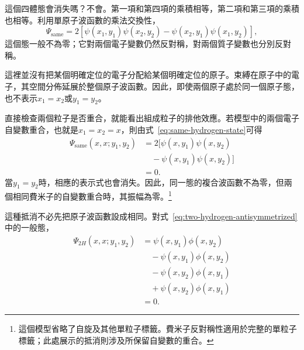 這個四體態會消失嗎？不會。第一項和第四項的乘積相等，第二項和第三項的乘積也相等。利用單原子波函數的乘法交換性，
\begin{equation}
\Psi_{\mathrm{same}}
=
2\left[
\psi(x_1,y_1)\psi(x_2,y_2)
-\psi(x_2,y_1)\psi(x_1,y_2)
\right],
\label{eq:same-hydrogen-state}
\end{equation}
這個態一般不為零；它對兩個電子變數仍然反對稱，對兩個質子變數也分別反對稱。

這裡並沒有把某個明確定位的電子分配給某個明確定位的原子。束縛在原子中的電子，其空間分佈延展於整個原子波函數。因此，即使兩個原子處於同一個原子態，也不表示\(x_1=x_2\)或\(y_1=y_2\)。

直接檢查兩個粒子是否重合，就能看出組成粒子的排他效應。若模型中的兩個電子自變數重合，也就是\(x_1=x_2=x\)，則由式~\eqref{eq:same-hydrogen-state}可得
\begin{align}
\Psi_{\mathrm{same}}(x,x;y_1,y_2)
&=2\bigl[
\psi(x,y_1)\psi(x,y_2)\nonumber\\
&\quad{}-\psi(x,y_1)\psi(x,y_2)
\bigr]\\
&=0.
\end{align}
當\(y_1=y_2\)時，相應的表示式也會消失。因此，同一態的複合波函數不為零，但兩個相同費米子的自變數重合時，其振幅為零。\footnote{這個模型省略了自旋及其他單粒子標籤。費米子反對稱性適用於完整的單粒子標籤；此處展示的抵消則涉及所保留自變數的重合。}

\begin{classroomqa}
\end{classroomqa}

\begin{classroomqa}
\end{classroomqa}

這種抵消不必先把原子波函數設成相同。對式~\eqref{eq:two-hydrogen-antisymmetrized}中的一般態，
\begin{align}
\Psi_{2H}(x,x;y_1,y_2)
&=\psi(x,y_1)\phi(x,y_2)\nonumber\\
&\quad{}-\psi(x,y_1)\phi(x,y_2)\nonumber\\
&\quad{}-\psi(x,y_2)\phi(x,y_1)\nonumber\\
&\quad{}+\psi(x,y_2)\phi(x,y_1)\\
&=0.
\end{align}

